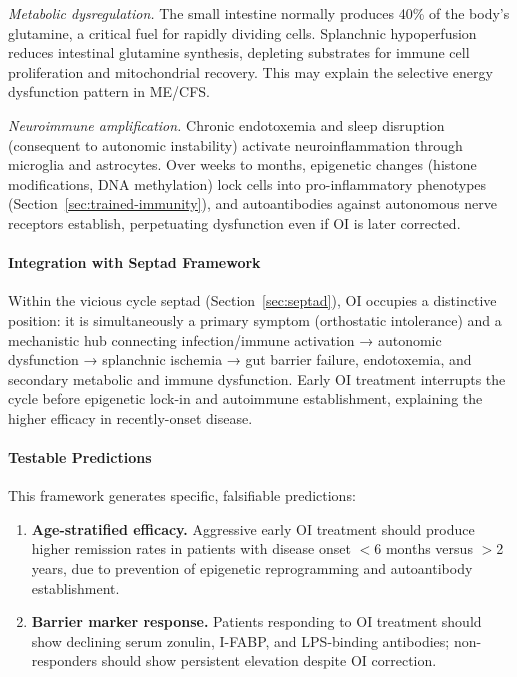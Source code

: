 \begin{keypoint}
\textit{Metabolic dysregulation.} The small intestine normally produces 40\% of the body's glutamine, a critical fuel for rapidly dividing cells. Splanchnic hypoperfusion reduces intestinal glutamine synthesis, depleting substrates for immune cell proliferation and mitochondrial recovery. This may explain the selective energy dysfunction pattern in ME/CFS.

\textit{Neuroimmune amplification.} Chronic endotoxemia and sleep disruption (consequent to autonomic instability) activate neuroinflammation through microglia and astrocytes. Over weeks to months, epigenetic changes (histone modifications, DNA methylation) lock cells into pro-inflammatory phenotypes (Section~\ref{sec:trained-immunity}), and autoantibodies against autonomous nerve receptors establish, perpetuating dysfunction even if OI is later corrected.

\paragraph{Integration with Septad Framework}
Within the vicious cycle septad (Section~\ref{sec:septad}), OI occupies a distinctive position: it is simultaneously a primary symptom (orthostatic intolerance) and a mechanistic hub connecting infection/immune activation → autonomic dysfunction → splanchnic ischemia → gut barrier failure, endotoxemia, and secondary metabolic and immune dysfunction. Early OI treatment interrupts the cycle before epigenetic lock-in and autoimmune establishment, explaining the higher efficacy in recently-onset disease.

\paragraph{Testable Predictions}
This framework generates specific, falsifiable predictions:

\begin{enumerate}
    \item \textbf{Age-stratified efficacy.} Aggressive early OI treatment should produce higher remission rates in patients with disease onset $<$6 months versus $>$2 years, due to prevention of epigenetic reprogramming and autoantibody establishment.

    \item \textbf{Barrier marker response.} Patients responding to OI treatment should show declining serum zonulin, I-FABP, and LPS-binding antibodies; non-responders should show persistent elevation despite OI correction.


\end{enumerate}
\end{keypoint}
